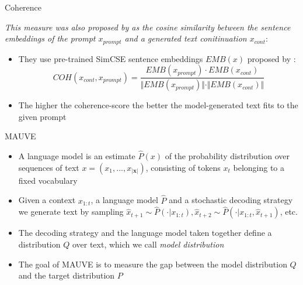\documentclass[11pt,compress,t,notes=noshow, xcolor=table]{beamer}
\begin{document}
\begin{vbframe}{Coherence}

\textit{This measure was also proposed by  as the cosine similarity between the sentence embeddings of the prompt $x_{prompt}$ and a generated text conitinuation $x_{cont}$}:

\begin{itemize}
    \item They use pre-trained SimCSE sentence embeddings $EMB(x)$ proposed by :
    $$COH(x_{cont}, x_{prompt}) = \frac{EMB(x_{prompt}) \cdot EMB(x_{cont})}{\Vert EMB(x_{prompt})\Vert \cdot \Vert EMB(x_{cont})\Vert}$$
    \item The higher the coherence-score the better the model-generated text fits to the given prompt
\end{itemize}
    
\end{vbframe}


\begin{vbframe}{MAUVE}

\vfill

\begin{itemize}
    \item A language model is an estimate $\hat{P}(x)$ of the probability distribution over sequences of text $x = (x_1, . . ., x_{|\mathbf{x}|})$, consisting of tokens $x_t$ belonging to a fixed vocabulary
    \item Given a context $x_{1:t}$, a language model $\hat{P}$ and a stochastic decoding strategy we generate text by sampling $\hat{x}_{t+1} \sim \hat{P}(\cdot|x_{1:t}), \hat{x}_{t+2} \sim \hat{P}(\cdot|x_{1:t}, \hat{x}_{t+1})$, etc.
    \item The decoding strategy and the language model taken together define a distribution $Q$ over text, which we call \textit{model distribution}
    \item The goal of MAUVE is to measure the gap between the model distribution $Q$ and the target distribution $P$
\end{itemize}

\vfill
    
\end{vbframe}
\end{document}
